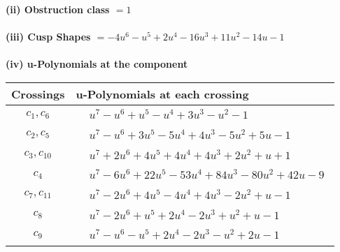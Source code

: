 \documentclass[1p]{elsarticle_modified}
\theoremstyle{definition}
\begin{document}
\flushleft \textbf{(ii) Obstruction class $= 1$}\\~\\
\flushleft \textbf{(iii) Cusp Shapes $= -4 u^6- u^5+2 u^4-16 u^3+11 u^2-14 u-1$}\\~\\
\newpage\renewcommand{\arraystretch}{1}
\flushleft \textbf{(iv) u-Polynomials at the component}\newline \\
\begin{tabular}{m{50pt}|m{274pt}}
Crossings & \hspace{64pt}u-Polynomials at each crossing \\
\hline $$\begin{aligned}c_{1},c_{6}\end{aligned}$$&$\begin{aligned}
&u^7- u^6+u^5- u^4+3 u^3- u^2-1
\end{aligned}$\\
\hline $$\begin{aligned}c_{2},c_{5}\end{aligned}$$&$\begin{aligned}
&u^7- u^6+3 u^5-5 u^4+4 u^3-5 u^2+5 u-1
\end{aligned}$\\
\hline $$\begin{aligned}c_{3},c_{10}\end{aligned}$$&$\begin{aligned}
&u^7+2 u^6+4 u^5+4 u^4+4 u^3+2 u^2+u+1
\end{aligned}$\\
\hline $$\begin{aligned}c_{4}\end{aligned}$$&$\begin{aligned}
&u^7-6 u^6+22 u^5-53 u^4+84 u^3-80 u^2+42 u-9
\end{aligned}$\\
\hline $$\begin{aligned}c_{7},c_{11}\end{aligned}$$&$\begin{aligned}
&u^7-2 u^6+4 u^5-4 u^4+4 u^3-2 u^2+u-1
\end{aligned}$\\
\hline $$\begin{aligned}c_{8}\end{aligned}$$&$\begin{aligned}
&u^7-2 u^6+u^5+2 u^4-2 u^3+u^2+u-1
\end{aligned}$\\
\hline $$\begin{aligned}c_{9}\end{aligned}$$&$\begin{aligned}
&u^7- u^6- u^5+2 u^4-2 u^3- u^2+2 u-1
\end{aligned}$\\
\hline
\end{tabular}\\~\\
\end{document}
